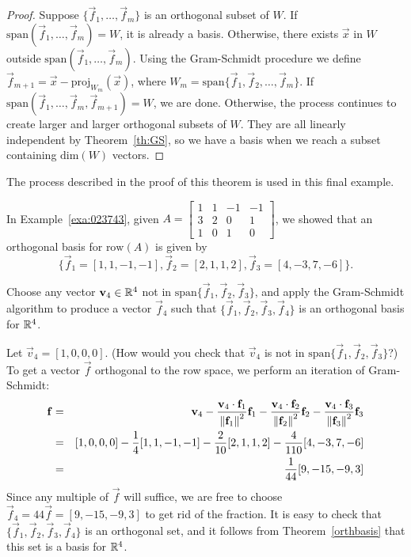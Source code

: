 \documentclass{ximera}
\begin{document}
\begin{proof}
Suppose $\{\vec{f}_{1}, \dots , \vec{f}_{m}\}$ is an orthogonal subset of $W$.  If $\mbox{span}\left(\vec{f}_{1}, \dots , \vec{f}_{m}\right) = W$, it is already a basis. Otherwise, there exists $\vec{x}$ in $W$ outside $\mbox{span}\left(\vec{f}_{1}, \dots , \vec{f}_{m}\right)$. Using the Gram-Schmidt procedure we define $\vec{f}_{m+1} = \vec{x} - \mbox{proj}_{W_{m}}(\vec{x})$, where $W_m = \mbox{span}\{\vec{f}_{1},\vec{f}_{2},\ldots,\vec{f}_{m}\}$. If $\mbox{span}\left(\vec{f}_{1}, \dots, \vec{f}_{m}, \vec{f}_{m+1}\right) = W$, we are done. Otherwise, the process continues to create larger and larger orthogonal subsets of $W$. They are all linearly independent by Theorem~\ref{th:GS}, so we have a basis when we reach a subset containing $\mbox{dim}(W)$ vectors.
\end{proof}

The process described in the proof of this theorem is used in this final example.

\begin{example}\label{ex:GSextend}
In Example~\ref{exa:023743}, given $A = \begin{bmatrix}
1 & 1 & -1 & -1\\
3 & 2 & 0 & 1\\
1 & 0 & 1 & 0
\end{bmatrix}$, we showed that an orthogonal basis for $\mbox{row}(A)$ is given by $$\{\vec{f}_1=[1, 1, -1, -1], \vec{f}_2=[2, 1, 1, 2], \vec{f}_3=[4, -3, 7, -6]\}.$$

Choose any vector $\mathbf{v}_4 \in \mathbb{R}^4$ not in $\mbox{span}\{\vec{f}_1, \vec{f}_2, \vec{f}_3\}$, and apply the Gram-Schmidt algorithm to produce a vector $\vec{f}_4$ such that $\{\vec{f}_1, \vec{f}_2, \vec{f}_3, \vec{f}_4\}$ is an orthogonal basis for $\mathbb{R}^4$.


\begin{explanation}
  Let $\vec{v}_4 = [1, 0, 0, 0]$.  (How would you check that $\vec{v}_4$ is not in $\mbox{span}\{\vec{f}_1, \vec{f}_2, \vec{f}_3\}$?)  To get a vector $\vec{f}$ orthogonal to the row space, we perform an iteration of Gram-Schmidt:
  \begin{eqnarray*}
      \mathbf{f} &=& \mathbf{v}_{4} - \frac{\mathbf{v}_{4} \cdot \mathbf{f}_{1}}{\left\lVert\mathbf{f}_{1}\right\rVert^2}\mathbf{f}_{1} - \frac{\mathbf{v}_{4} \cdot \mathbf{f}_{2}}{\left\lVert\mathbf{f}_{2}\right\rVert^2}\mathbf{f}_{2} - \frac{\mathbf{v}_{4} \cdot \mathbf{f}_{3}}{\left\lVert\mathbf{f}_{3}\right\rVert^2}\mathbf{f}_{3} \\
      &=& [1, 0, 0, 0] - \frac{1}{4}[1, 1, -1, -1] - \frac{2}{10}[2, 1, 1, 2] - \frac{4}{110}[4, -3, 7, -6] \\
      &=&\frac{1}{44}[9, -15, -9, 3]
  \end{eqnarray*}
  Since any multiple of $\vec{f}$ will suffice, we are free to choose $\vec{f}_{4} = 44\vec{f} = [9, -15, -9, 3]$ to get rid of the fraction.  It is easy to check that $\{\vec{f}_1, \vec{f}_2, \vec{f}_3, \vec{f}_4\}$ is an orthogonal set, and it follows from Theorem~\ref{orthbasis} that this set is a basis for $\mathbb{R}^4$.
\end{explanation}
\end{example}
\end{document}
